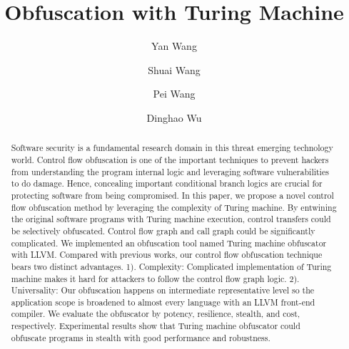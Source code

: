 \documentclass[lnicst]{svmultln}
\begin{document}
%
\mainmatter              %
%
\title{Obfuscation with Turing Machine}
%
%
\author{Yan Wang \and Shuai Wang \and Pei Wang \and Dinghao Wu}
%
%
%
\institute{The Pennsylvania State University\\University Park, PA 16802, USA\\
\email{{ybw5084,szw175,pxw172,dwu}@ist.psu.edu} %
}
\maketitle              

\begin{abstract}        %
Software security is a fundamental research domain in this threat emerging
technology world. Control flow obfuscation is one of the important techniques to
prevent hackers from understanding the program internal logic and leveraging
software vulnerabilities to do damage. Hence, concealing important conditional
branch logics are crucial for protecting software from being compromised. In
this paper, we propose a novel control flow obfuscation method by leveraging the
complexity of Turing machine. By entwining the original software programs with
Turing machine execution, control transfers could be selectively obfuscated.
Control flow graph and call graph could be significantly complicated. We
implemented an obfuscation tool named Turing machine obfuscator with LLVM.
Compared with previous works, our control flow obfuscation technique bears two
distinct advantages. 1). Complexity: Complicated implementation of Turing machine
makes it hard for attackers to follow the control flow graph
logic. 2). Universality: Our obfuscation happens on intermediate representative
level so the application scope is broadened to almost every language with an LLVM
front-end compiler. We evaluate the obfuscator by potency, resilience, stealth,
and cost, respectively. Experimental results show that Turing machine obfuscator
could obfuscate programs in stealth with good performance and robustness.
\end{abstract}
%
\end{document}
